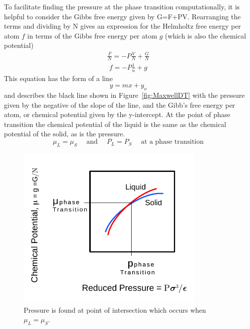 \documentclass[double,12pt]{beavtex}
\begin{document}
To facilitate finding the pressure at the phase transition computationally, 
it is helpful to consider the Gibbs free energy given by G=F+PV. 
Rearranging the terms and dividing by N gives an  expression for the 
Helmholtz free energy per atom $f$ in terms of the Gibbs free energy 
per atom  $g$ (which is also the chemical potential)  
\begin{align}\frac{F}{N} = -P\frac{V}{N}+\frac{G}{N} \end{align}
\begin{align}f=-P\frac{1}{n}+g\end{align}
This equation has the form of a line
\begin{equation}
    y=mx+y_o
\end{equation}
and describes the black line shown in Figure~\ref{fig:MaxwellDT} with the 
pressure given by the negative of the slope of the line, and the Gibb's 
free energy per atom, or chemical potential given by the y-intercept. 
At the point of phase transition the chemical potential of the liquid is 
the same as the chemical potential of the solid, as is the pressure.
\begin{equation}
    \mu_L=\mu_S\mbox{~~~~and~~~~}P_L=P_S\mbox{~~~~at a phase transition}
\end{equation} 

 \begin{figure}
    \centering
     \includegraphics[height=8cm]{figs/MaxwellDTC-Fig2.pdf}
    \caption{Pressure is found at point of intersection which occurs 
    when $\mu_L=\mu_S$.}
    \label{fig:GibbsvsP}
  \end{figure}
  
\end{document}
